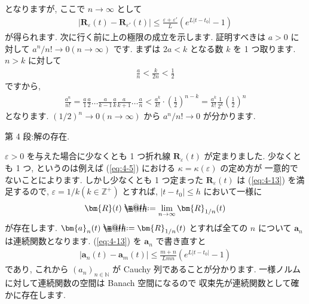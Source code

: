 \documentclass[openany, a4paper, oneside]{book}
\makeatletter
\newcommand*{\defeq}{\mathrel{\rlap{%
\raisebox{0.3ex}{$\m@th\cdot$}}%
\raisebox{-0.3ex}{$\m@th\cdot$}}%
=}
\theoremstyle{break}
\theoremstyle{breakdefn}
\newcommand{\abs}[1]{\left|#1\right|}
\newcommand{\bN}{\mathbb{N}}
\newcommand{\bbZ}{\mathbb{Z}}
\newcommand{\vep}{\varepsilon}
\makeatother
\begin{document}
となりますが, ここで $n\to\infty$ として
\begin{gather}
 \abs{\bm{R}_{\vep} (t) - \bm{R}_{\vep '} (t)}
 \leq
 \frac{\vep + \vep '} {L} \left ( e^{ L | t - t_0 | } -1 \right) \label{eq:4-13}
\end{gather}
が得られます.
次に行く前に上の極限の成立を示します. 証明すべきは $a>0$ に対して $a^n/n! \to 0 ( n \to \infty )$ です.
まずは $2a<k$ となる数 $k$ を 1 つ取ります.
$n>k$ に対して
\begin{gather}
 \frac{a}{n}
 <
 \frac{k}{2n}
 <
 \frac{1}{2}
\end{gather}
ですから,
\begin{gather}
 \frac{a^n} {n!}
 =
 \frac{a}{1} \frac{a}{2} \dots \frac{a}{k-1} \frac{a}{k} \frac{a}{k+1} \dots \frac{a}{n}
 <
 \frac{a^k}{k!} \cdot \left ( \frac{1}{2} \right) ^{n-k}
 =
 \frac{a^k}{k!} \frac{1}{2^k} \left ( \frac{1}{2} \right)^n
\end{gather}
となります.
$(1/2)^n \to 0 (n \to \infty)$ から $a^n/n! \to 0$ が分かります.

第 4 段:解の存在.

$\vep>0$ を与えた場合に少なくとも 1 つ折れ線 $\bm{R}_{\vep}(t)$ が定まりました.
少なくとも 1 つ, というのは例えば (\ref{eq:4-5}) における $\kappa = \kappa (\vep)$ の定め方が
一意的でないことによります.
しかし少なくとも 1 つ定まった $\bm{R}_{\vep}(t)$ は (\ref{eq:4-13}) を満足するので,
$\vep = 1/k (k \in \bbZ^+)$ とすれば,  $| t - t_0 | \leq h$ において一様に
\begin{gather}
\bm{R}(t)
\defeq
\lim_{n\to\infty} \bm{R}_{ 1/n } (t)
\label{eq:4-14}
\end{gather}
が存在します.
$\bm{a}_n (t) \defeq \bm{R}_{1/n}(t)$ とすれば全ての $n$ について $\bm{a}_n$ は連続関数となります.
(\ref{eq:4-13}) を $\bm{a}_n$ で書き直すと
\begin{gather}
\abs{\bm{a}_n (t) - \bm{a}_m (t)}
\leq
\frac{m + n} {Lmn} ( e^{ L | t - t_0 |} - 1 )
\label{eq:4-1.42}
\end{gather}
であり, これから $(a_n)_{n\in \bN}$ が Cauchy 列であることが分かります.
一様ノルムに対して連続関数の空間は Banach 空間になるので
収束先が連続関数として確かに存在します.
\end{document}
